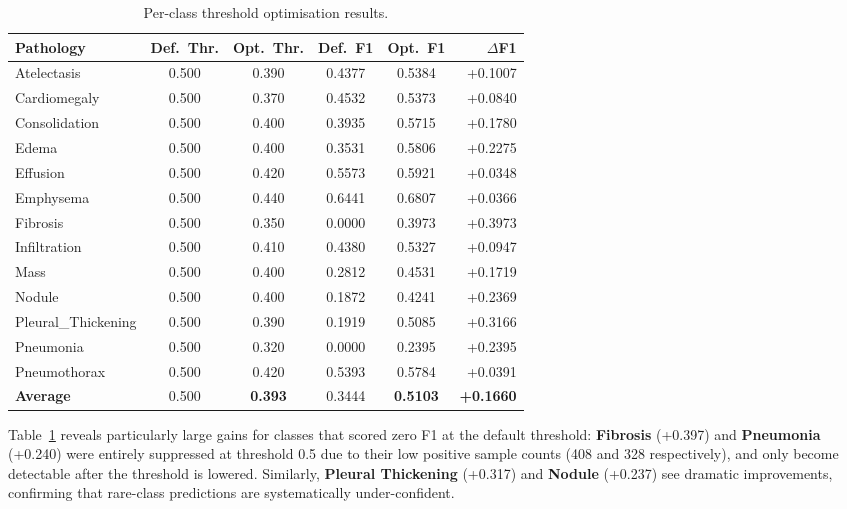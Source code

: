 \begin{table}[ht]
\centering
\caption{Per-class threshold optimisation results.}
\label{tab:threshold_perclass}
\renewcommand{\arraystretch}{1.3}
\begin{tabular}{lccccr}
\toprule
\textbf{Pathology} & \textbf{Def.\ Thr.} & \textbf{Opt.\ Thr.} & \textbf{Def.\ F1} & \textbf{Opt.\ F1} & \textbf{$\Delta$F1} \\
\midrule
Atelectasis        & 0.500 & 0.390 & 0.4377 & 0.5384 & +0.1007 \\
Cardiomegaly       & 0.500 & 0.370 & 0.4532 & 0.5373 & +0.0840 \\
Consolidation      & 0.500 & 0.400 & 0.3935 & 0.5715 & +0.1780 \\
Edema              & 0.500 & 0.400 & 0.3531 & 0.5806 & +0.2275 \\
Effusion           & 0.500 & 0.420 & 0.5573 & 0.5921 & +0.0348 \\
Emphysema          & 0.500 & 0.440 & 0.6441 & 0.6807 & +0.0366 \\
Fibrosis           & 0.500 & 0.350 & 0.0000 & 0.3973 & +0.3973 \\
Infiltration       & 0.500 & 0.410 & 0.4380 & 0.5327 & +0.0947 \\
Mass               & 0.500 & 0.400 & 0.2812 & 0.4531 & +0.1719 \\
Nodule             & 0.500 & 0.400 & 0.1872 & 0.4241 & +0.2369 \\
Pleural\_Thickening & 0.500 & 0.390 & 0.1919 & 0.5085 & +0.3166 \\
Pneumonia          & 0.500 & 0.320 & 0.0000 & 0.2395 & +0.2395 \\
Pneumothorax       & 0.500 & 0.420 & 0.5393 & 0.5784 & +0.0391 \\
\midrule
\textbf{Average}   & 0.500 & \textbf{0.393} & 0.3444 & \textbf{0.5103} & \textbf{+0.1660} \\
\bottomrule
\end{tabular}
\end{table}

Table~\ref{tab:threshold_perclass} reveals particularly large gains for classes that scored zero F1 at the default threshold: \textbf{Fibrosis} (+0.397) and \textbf{Pneumonia} (+0.240) were entirely suppressed at threshold 0.5 due to their low positive sample counts (408 and 328 respectively), and only become detectable after the threshold is lowered. Similarly, \textbf{Pleural Thickening} (+0.317) and \textbf{Nodule} (+0.237) see dramatic improvements, confirming that rare-class predictions are systematically under-confident.

